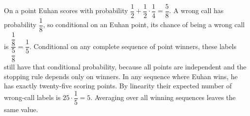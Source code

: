 On a point Euhan scores with probability $\dfrac{1}{2}+\dfrac{1}{2}\cdot\dfrac{1}{4}=\dfrac{5}{8}$. A wrong call has probability $\dfrac{1}{8}$, so conditional on an Euhan point, its chance of being a wrong call is $\dfrac{\dfrac{1}{8}}{\dfrac{5}{8}}=\dfrac{1}{5}$. Conditional on any complete sequence of point winners, these labels still have that conditional probability, because all points are independent and the stopping rule depends only on winners. In any sequence where Euhan wins, he has exactly twenty-five scoring points. By linearity their expected number of wrong-call labels is $25\cdot\dfrac{1}{5}=\boxed5$. Averaging over all winning sequences leaves the same value.
